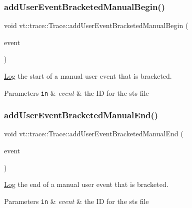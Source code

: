 \subsubsection{\texorpdfstring{add\+User\+Event\+Bracketed\+Manual\+Begin()}{addUserEventBracketedManualBegin()}}
{\footnotesize\ttfamily void vt\+::trace\+::\+Trace\+::add\+User\+Event\+Bracketed\+Manual\+Begin (\begin{DoxyParamCaption}\item[{\hyperlink{namespacevt_1_1trace_a70c43e0e1596eea236912d4197d3120a}{User\+Spec\+Event\+I\+D\+Type}}]{event }\end{DoxyParamCaption})}



\hyperlink{structvt_1_1trace_1_1_log}{Log} the start of a manual user event that is bracketed. 


\begin{DoxyParams}[1]{Parameters}
\mbox{\tt in}  & {\em event} & the ID for the sts file \\
\hline
\end{DoxyParams}
\mbox{\label{structvt_1_1trace_1_1_trace_a5de97038ac60bfcdf868c3f32637ef9e}} 
\subsubsection{\texorpdfstring{add\+User\+Event\+Bracketed\+Manual\+End()}{addUserEventBracketedManualEnd()}}
{\footnotesize\ttfamily void vt\+::trace\+::\+Trace\+::add\+User\+Event\+Bracketed\+Manual\+End (\begin{DoxyParamCaption}\item[{\hyperlink{namespacevt_1_1trace_a70c43e0e1596eea236912d4197d3120a}{User\+Spec\+Event\+I\+D\+Type}}]{event }\end{DoxyParamCaption})}



\hyperlink{structvt_1_1trace_1_1_log}{Log} the end of a manual user event that is bracketed. 


\begin{DoxyParams}[1]{Parameters}
\mbox{\tt in}  & {\em event} & the ID for the sts file \\
\hline
\end{DoxyParams}
\mbox{\label{structvt_1_1trace_1_1_trace_a2d9fac6bd71ba67e4f87b7efd7c6c6c7}} 
